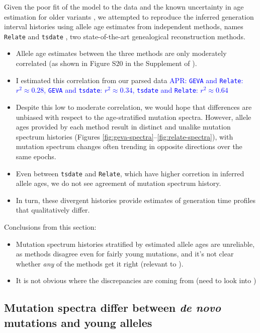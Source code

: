 \documentclass[]{article}
\newcommand{\aprcomment}[1]{{\textcolor{blue}{APR: #1}}}
\newcommand{\GEVA}{\texttt{GEVA}\xspace}
\newcommand{\tsdate}{\texttt{tsdate}\xspace}
\newcommand{\relate}{\texttt{Relate}\xspace}
\begin{document}
Given the poor fit of the model to the data and the known uncertainty in age
estimation for older variants \citep{albers2020dating}, we attempted to
reproduce the inferred generation interval histories using allele age estimates
from independent methods, names \relate \citep{speidel2019method} and \tsdate
\citep{wohns2022unified}, two state-of-the-art genealogical reconstruction
methods.
\begin{itemize}
    \item Allele age estimates between the three methods are only moderately
        correlated (as shown in Figure S20 in the Supplement of
        \citet{wohns2022unified}).
    \item I estimated this correlation from our parsed data
        \aprcomment{
            \GEVA and \relate: $r^2 \approx 0.28$,
            \GEVA and \tsdate: $r^2 \approx 0.34$,
            \tsdate and \relate: $r^2 \approx 0.64$
        }
    \item Despite this low to moderate correlation, 
        we would hope that differences are
        unbiased with respect to the age-stratified mutation spectra. However,
        allele ages provided by each method result in distinct and
        unalike mutation spectrum histories (Figures
        \ref{fig:geva-spectra}--\ref{fig:relate-spectra}), with mutation
        spectrum changes often trending in opposite directions over the same
        epochs.
    \item Even between \tsdate and \relate, which have higher corretion in
        inferred allele ages, we do not see agreement of mutation spectrum
        history.
    \item In turn, these divergent histories provide estimates of
        generation time profiles that qualitatively differ.
\end{itemize}

Conclusions from this section:
\begin{itemize}
    \item Mutation spectrum histories stratified by estimated allele ages are
        unreliable, as methods disagree even for fairly young mutations,
        and it's not clear whether \emph{any} of the methods get
        it right (relevant to \citet{gao2022limited}).
    \item It is not obvious where the discrepancies are coming from (need
        to look into \citet{brandt2022evaluation})
\end{itemize}

\subsection*{Mutation spectra differ between \emph{de novo} mutations and young
alleles}
\end{document}
